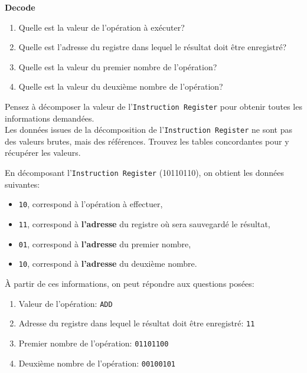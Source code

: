 \begin{Exercice}[5 minutes] \textbf{Decode}
    \begin{enumerate}
        \item Quelle est la valeur de l'opération à exécuter?
        \item Quelle est l'adresse du registre dans lequel le résultat doit être enregistré?
        \item Quelle est la valeur du premier nombre de l'opération?
        \item Quelle est la valeur du deuxième nombre de l'opération?
    \end{enumerate}

    \begin{conseil}
        Pensez à décomposer la valeur de l'\lstinline{Instruction Register} pour obtenir toutes les informations demandées. \\
        Les données issues de la décomposition de l'\lstinline{Instruction Register} ne sont pas des valeurs brutes, mais des références. Trouvez les tables concordantes pour y récupérer les valeurs.
    \end{conseil}

    \begin{solution}
        En décomposant l'\lstinline{Instruction Register} (10110110), on obtient les données suivantes:
        \begin{itemize}
            \item \lstinline{10}, correspond à l'opération à effectuer,
            \item \lstinline{11}, correspond à \textbf{l'adresse} du registre où sera sauvegardé le résultat,
            \item \lstinline{01}, correspond à \textbf{l'adresse} du premier nombre,
            \item \lstinline{10}, correspond à \textbf{l'adresse} du deuxième nombre.\\
        \end{itemize}
        
    À partir de ces informations, on peut répondre aux questions posées:
       \begin{enumerate}
           \item Valeur de l'opération: \lstinline{ADD}
           \item Adresse du registre dans lequel le résultat doit être enregistré: \lstinline{11}
           \item Premier nombre de l'opération: \lstinline{01101100}
           \item Deuxième nombre de l'opération: \lstinline{00100101}
       \end{enumerate}
    \end{solution}
\end{Exercice}

